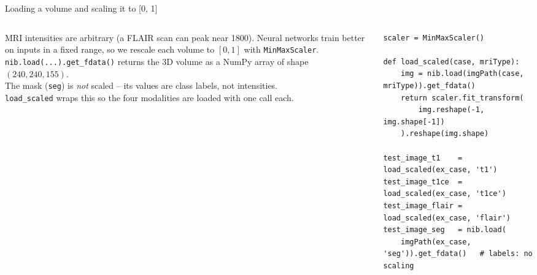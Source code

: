 \documentclass[10pt,aspectratio=169]{beamer}
\begin{document}
\begin{frame}[fragile]{Loading a volume and scaling it to [0, 1]}
\begin{columns}[T,onlytextwidth]
\begin{column}{0.42\textwidth}
\small
MRI intensities are arbitrary (a FLAIR scan can peak near 1800). Neural networks train better on
inputs in a fixed range, so we rescale each volume to $[0,1]$ with \texttt{MinMaxScaler}.\\[0.4em]
\texttt{nib.load(...).get\_fdata()} returns the 3D volume as a NumPy array of shape
$(240, 240, 155)$.\\[0.4em]
The mask (\texttt{seg}) is \emph{not} scaled -- its values are class labels, not intensities.\\[0.4em]
\texttt{load\_scaled} wraps this so the four modalities are loaded with one call each.
\end{column}
\begin{column}{0.56\textwidth}
\begin{lstlisting}[firstnumber=last]
scaler = MinMaxScaler()

def load_scaled(case, mriType):
    img = nib.load(imgPath(case, mriType)).get_fdata()
    return scaler.fit_transform(
        img.reshape(-1, img.shape[-1])
    ).reshape(img.shape)

test_image_t1    = load_scaled(ex_case, 't1')
test_image_t1ce  = load_scaled(ex_case, 't1ce')
test_image_flair = load_scaled(ex_case, 'flair')
test_image_seg   = nib.load(
    imgPath(ex_case, 'seg')).get_fdata()   # labels: no scaling
\end{lstlisting}
\end{column}
\end{columns}
\end{frame}
\end{document}
